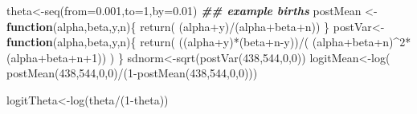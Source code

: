 \documentclass[
]{book}
\newenvironment{Shaded}{\begin{snugshade}}{\end{snugshade}}
\newcommand{\AttributeTok}[1]{\textcolor[rgb]{0.77,0.63,0.00}{#1}}
\newcommand{\ControlFlowTok}[1]{\textcolor[rgb]{0.13,0.29,0.53}{\textbf{#1}}}
\newcommand{\DecValTok}[1]{\textcolor[rgb]{0.00,0.00,0.81}{#1}}
\newcommand{\DocumentationTok}[1]{\textcolor[rgb]{0.56,0.35,0.01}{\textbf{\textit{#1}}}}
\newcommand{\FloatTok}[1]{\textcolor[rgb]{0.00,0.00,0.81}{#1}}
\newcommand{\FunctionTok}[1]{\textcolor[rgb]{0.00,0.00,0.00}{#1}}
\newcommand{\NormalTok}[1]{#1}
\newcommand{\OtherTok}[1]{\textcolor[rgb]{0.56,0.35,0.01}{#1}}
\newcommand{\SpecialCharTok}[1]{\textcolor[rgb]{0.00,0.00,0.00}{#1}}
\theoremstyle{definition}
\theoremstyle{definition}
\theoremstyle{definition}
\theoremstyle{definition}
\theoremstyle{remark}
\begin{document}
\begin{Shaded}
\begin{Highlighting}[]
\NormalTok{  theta}\OtherTok{\textless{}{-}}\FunctionTok{seq}\NormalTok{(}\AttributeTok{from=}\FloatTok{0.001}\NormalTok{,}\AttributeTok{to=}\DecValTok{1}\NormalTok{,}\AttributeTok{by=}\FloatTok{0.01}\NormalTok{)}
  \DocumentationTok{\#\# example births}
\NormalTok{   postMean }\OtherTok{\textless{}{-}}\ControlFlowTok{function}\NormalTok{(alpha,beta,y,n)\{}
     \FunctionTok{return}\NormalTok{( (alpha}\SpecialCharTok{+}\NormalTok{y)}\SpecialCharTok{/}\NormalTok{(alpha}\SpecialCharTok{+}\NormalTok{beta}\SpecialCharTok{+}\NormalTok{n))}
\NormalTok{   \} }
\NormalTok{   postVar}\OtherTok{\textless{}{-}}\ControlFlowTok{function}\NormalTok{(alpha,beta,y,n)\{}
     \FunctionTok{return}\NormalTok{( ((alpha}\SpecialCharTok{+}\NormalTok{y)}\SpecialCharTok{*}\NormalTok{(beta}\SpecialCharTok{+}\NormalTok{n}\SpecialCharTok{{-}}\NormalTok{y))}\SpecialCharTok{/}\NormalTok{( (alpha}\SpecialCharTok{+}\NormalTok{beta}\SpecialCharTok{+}\NormalTok{n)}\SpecialCharTok{\^{}}\DecValTok{2}\SpecialCharTok{*}\NormalTok{(alpha}\SpecialCharTok{+}\NormalTok{beta}\SpecialCharTok{+}\NormalTok{n}\SpecialCharTok{+}\DecValTok{1}\NormalTok{)) )}
\NormalTok{   \}}
\NormalTok{   sdnorm}\OtherTok{\textless{}{-}}\FunctionTok{sqrt}\NormalTok{(}\FunctionTok{postVar}\NormalTok{(}\DecValTok{438}\NormalTok{,}\DecValTok{544}\NormalTok{,}\DecValTok{0}\NormalTok{,}\DecValTok{0}\NormalTok{))}
\NormalTok{   logitMean}\OtherTok{\textless{}{-}}\FunctionTok{log}\NormalTok{( }\FunctionTok{postMean}\NormalTok{(}\DecValTok{438}\NormalTok{,}\DecValTok{544}\NormalTok{,}\DecValTok{0}\NormalTok{,}\DecValTok{0}\NormalTok{)}\SpecialCharTok{/}\NormalTok{(}\DecValTok{1}\SpecialCharTok{{-}}\FunctionTok{postMean}\NormalTok{(}\DecValTok{438}\NormalTok{,}\DecValTok{544}\NormalTok{,}\DecValTok{0}\NormalTok{,}\DecValTok{0}\NormalTok{)))}
   
\NormalTok{  logitTheta}\OtherTok{\textless{}{-}}\FunctionTok{log}\NormalTok{(theta}\SpecialCharTok{/}\NormalTok{(}\DecValTok{1}\SpecialCharTok{{-}}\NormalTok{theta))}


\end{Highlighting}
\end{Shaded}
\end{document}
